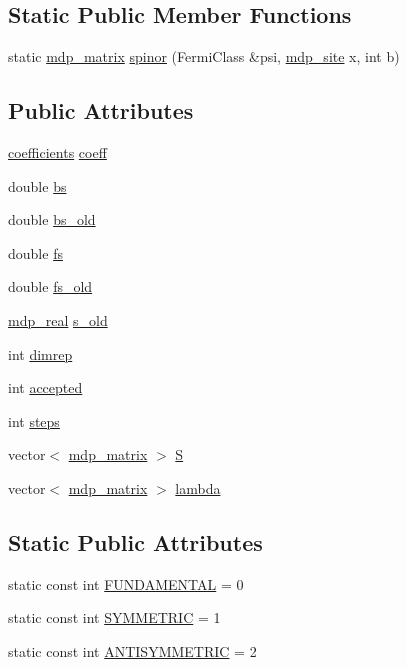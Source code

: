 \subsection*{Static Public Member Functions}
\begin{DoxyCompactItemize}
\item 
static \hyperlink{classmdp__matrix}{mdp\_\-matrix} \hyperlink{class_h_m_c_a95adca9cab9649becfe31b5f346713d9}{spinor} (FermiClass \&psi, \hyperlink{classmdp__site}{mdp\_\-site} x, int b)
\end{DoxyCompactItemize}
\subsection*{Public Attributes}
\begin{DoxyCompactItemize}
\item 
\hyperlink{classcoefficients}{coefficients} \hyperlink{class_h_m_c_aa7a373acc998a08fcdc2e86dc6084b7b}{coeff}
\item 
double \hyperlink{class_h_m_c_a940413017301b1520e4c6108a527c7c9}{bs}
\item 
double \hyperlink{class_h_m_c_a4146b7b06fcf3410b9bfda1c88c5fe39}{bs\_\-old}
\item 
double \hyperlink{class_h_m_c_ae7be326ed9dadc4876de7f60dd683e37}{fs}
\item 
double \hyperlink{class_h_m_c_a4f80874711a6599cb8c579dda6e088fb}{fs\_\-old}
\item 
\hyperlink{mdp__global__vars_8h_a049e4c1d4e74d644878a42f9909463e4}{mdp\_\-real} \hyperlink{class_h_m_c_a54ce598a989a71f3bfbb58057dcea2ed}{s\_\-old}
\item 
int \hyperlink{class_h_m_c_a64181f9b0ebb652e395799bae2c8bfc7}{dimrep}
\item 
int \hyperlink{class_h_m_c_a11cb072cbdfddf4f6f6055bc77ae6b3a}{accepted}
\item 
int \hyperlink{class_h_m_c_a0254c831e713cdad8e2bbec4c247c045}{steps}
\item 
vector$<$ \hyperlink{classmdp__matrix}{mdp\_\-matrix} $>$ \hyperlink{class_h_m_c_a6007dbb2f937f629bbf5253a915b18fa}{S}
\item 
vector$<$ \hyperlink{classmdp__matrix}{mdp\_\-matrix} $>$ \hyperlink{class_h_m_c_a49121fbbef9d15281bc5a045fa0d07ce}{lambda}
\end{DoxyCompactItemize}
\subsection*{Static Public Attributes}
\begin{DoxyCompactItemize}
\item 
static const int \hyperlink{class_h_m_c_a5fe0965bb8e3d1220f60979189e86357}{FUNDAMENTAL} = 0
\item 
static const int \hyperlink{class_h_m_c_adf96eacce9b78dfd329076b35b8544f5}{SYMMETRIC} = 1
\item 
static const int \hyperlink{class_h_m_c_a2be12d54de2a0c63f56f8a7168780f5d}{ANTISYMMETRIC} = 2
\end{DoxyCompactItemize}
